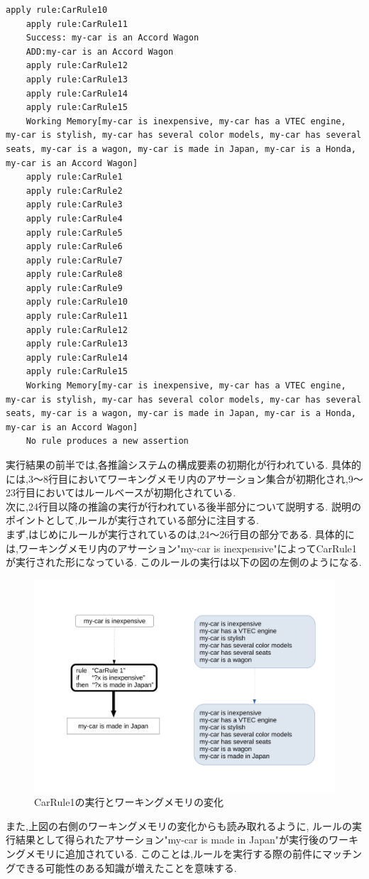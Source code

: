 \documentclass[uplatex,12pt]{jsarticle}
\begin{document}
\begin{lstlisting}[caption=前向き推論の実行結果 , label=mid]
    apply rule:CarRule10
    apply rule:CarRule11
    Success: my-car is an Accord Wagon
    ADD:my-car is an Accord Wagon
    apply rule:CarRule12
    apply rule:CarRule13
    apply rule:CarRule14
    apply rule:CarRule15
    Working Memory[my-car is inexpensive, my-car has a VTEC engine, my-car is stylish, my-car has several color models, my-car has several seats, my-car is a wagon, my-car is made in Japan, my-car is a Honda, my-car is an Accord Wagon]
    apply rule:CarRule1
    apply rule:CarRule2
    apply rule:CarRule3
    apply rule:CarRule4
    apply rule:CarRule5
    apply rule:CarRule6
    apply rule:CarRule7
    apply rule:CarRule8
    apply rule:CarRule9
    apply rule:CarRule10
    apply rule:CarRule11
    apply rule:CarRule12
    apply rule:CarRule13
    apply rule:CarRule14
    apply rule:CarRule15
    Working Memory[my-car is inexpensive, my-car has a VTEC engine, my-car is stylish, my-car has several color models, my-car has several seats, my-car is a wagon, my-car is made in Japan, my-car is a Honda, my-car is an Accord Wagon]
    No rule produces a new assertion
\end{lstlisting}
実行結果の前半では,各推論システムの構成要素の初期化が行われている.
具体的には,3〜8行目においてワーキングメモリ内のアサーション集合が初期化され,9〜23行目においてはルールベースが初期化されている. \\
次に,24行目以降の推論の実行が行われている後半部分について説明する.
説明のポイントとして,ルールが実行されている部分に注目する. \\
まず,はじめにルールが実行されているのは,24〜26行目の部分である.
具体的には,ワーキングメモリ内のアサーション"my-car is inexpensive"によってCarRule1が実行された形になっている.
このルールの実行は以下の図の左側のようになる. \\
\begin{figure}[!hbt]
    \centering
    \includegraphics[scale=0.40]{images/forward_chaining_1.pdf}
    \caption{CarRule1の実行とワーキングメモリの変化}
\end{figure}
\newpage
また,上図の右側のワーキングメモリの変化からも読み取れるように,
ルールの実行結果として得られたアサーション"my-car is made in Japan"が実行後のワーキングメモリに追加されている.
このことは,ルールを実行する際の前件にマッチングできる可能性のある知識が増えたことを意味する. \\
\end{document}
